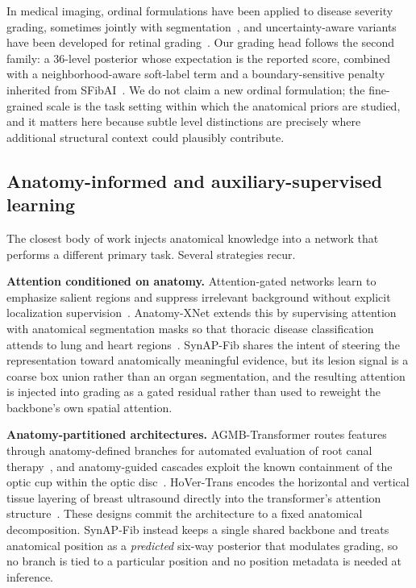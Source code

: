 In medical imaging, ordinal formulations have been applied to disease severity
grading, sometimes jointly with segmentation~\cite{sonnet2022}, and
uncertainty-aware variants have been developed for retinal
grading~\cite{drgraduate2020}. Our grading head follows the second family: a
36-level posterior whose expectation is the reported score, combined with a
neighborhood-aware soft-label term and a boundary-sensitive penalty inherited
from SFibAI~\cite{xu2026sfibai}. We do not claim a new ordinal formulation;
the fine-grained scale is the task setting within which the anatomical priors
are studied, and it matters here because subtle level distinctions are precisely
where additional structural context could plausibly contribute.

\subsection{Anatomy-informed and auxiliary-supervised learning}

The closest body of work injects anatomical knowledge into a network that
performs a different primary task. Several strategies recur.

\textbf{Attention conditioned on anatomy.} Attention-gated networks learn to
emphasize salient regions and suppress irrelevant background without explicit
localization supervision~\cite{attentiongated2019}. Anatomy-XNet extends this
by supervising attention with anatomical segmentation masks so that thoracic
disease classification attends to lung and heart
regions~\cite{anatomyxnet2022}. SynAP-Fib shares the intent of steering the
representation toward anatomically meaningful evidence, but its lesion signal is
a coarse box union rather than an organ segmentation, and the resulting
attention is injected into grading as a gated residual rather than used to
reweight the backbone's own spatial attention.

\textbf{Anatomy-partitioned architectures.} AGMB-Transformer routes features
through anatomy-defined branches for automated evaluation of root canal
therapy~\cite{agmbtransformer2021}, and anatomy-guided cascades exploit the
known containment of the optic cup within the optic disc~\cite{opticdisc2020}.
HoVer-Trans encodes the horizontal and vertical tissue layering of breast
ultrasound directly into the transformer's attention
structure~\cite{hovertrans2023}. These designs commit the architecture to a
fixed anatomical decomposition. SynAP-Fib instead keeps a single shared
backbone and treats anatomical position as a \emph{predicted} six-way posterior
that modulates grading, so no branch is tied to a particular position and no
position metadata is needed at inference.

